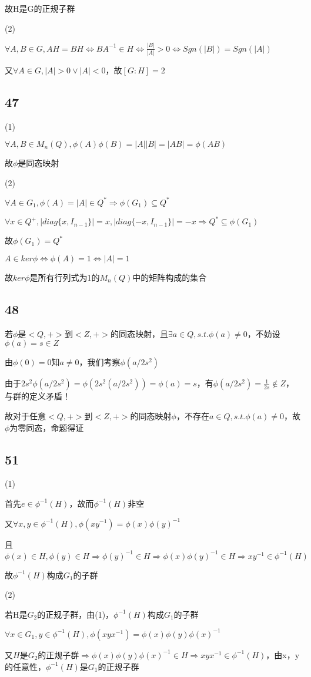 \documentclass[UTF8]{ctexart}
\begin{document}
故H是G的正规子群

(2)

$\forall A, B\in G, AH = BH\Leftrightarrow BA^{-1}\in H\Leftrightarrow \frac{|B|}{|A|} > 0\Leftrightarrow Sgn(|B|) = Sgn(|A|)$

又$\forall A\in G, |A| > 0\lor |A| < 0$，故$[G:H] = 2$

\subsection*{47}

(1)

$\forall A, B\in M_n(Q), \phi(A)\phi(B) = |A||B| = |AB| = \phi(AB)$

故$\phi$是同态映射

(2)

$\forall A\in G_1, \phi(A) = |A|\in Q^*\Rightarrow \phi(G_1)\subseteq Q^*$

$\forall x\in Q^+, |diag\{x, I_{n-1}\}| = x, |diag\{-x, I_{n-1}\}| = -x\Rightarrow Q^*\subseteq \phi(G_1)$

故$\phi(G_1) = Q^*$

$A\in ker\phi\Leftrightarrow \phi(A) = 1\Leftrightarrow |A| = 1$

故$ker\phi$是所有行列式为1的$M_n(Q)$中的矩阵构成的集合

\subsection*{48}

若$\phi$是$<Q, +>$到$<Z, +>$的同态映射，且$\exists a\in Q, s.t. \phi(a)\neq 0$，不妨设$\phi(a) = s\in Z$

由$\phi(0) = 0$知$a\neq 0$，我们考察$\phi(a / 2s^2)$

由于$2s^2\phi(a / 2s^2) = \phi(2s^2(a / 2s^2)) = \phi(a) = s$，有$\phi(a / 2s^2) = \frac{1}{2s}\notin Z$，与群的定义矛盾！

故对于任意$<Q, +>$到$<Z, +>$的同态映射$\phi$，不存在$a\in Q, s.t. \phi(a)\neq 0$，故$\phi$为零同态，命题得证

\subsection*{51}

(1)

首先$e\in \phi^{-1}(H)$，故而$\phi^{-1}(H)$非空

又$\forall x, y\in \phi^{-1}(H), \phi(xy^{-1}) = \phi(x)\phi(y)^{-1}$

且$\phi(x)\in H, \phi(y)\in H\Rightarrow \phi(y)^{-1}\in H\Rightarrow \phi(x)\phi(y)^{-1}\in H\Rightarrow xy^{-1}\in \phi^{-1}(H)$

故$\phi^{-1}(H)$构成$G_1$的子群

(2)

若H是$G_2$的正规子群，由(1)，$\phi^{-1}(H)$构成$G_1$的子群

$\forall x\in G_1, y\in \phi^{-1}(H), \phi(xyx^{-1}) = \phi(x)\phi(y)\phi(x)^{-1}$

又$H$是$G_2$的正规子群$\Rightarrow\phi(x)\phi(y)\phi(x)^{-1}\in H\Rightarrow xyx^{-1}\in \phi^{-1}(H)$，由x，y的任意性，$\phi^{-1}(H)$是$G_1$的正规子群
\end{document}

